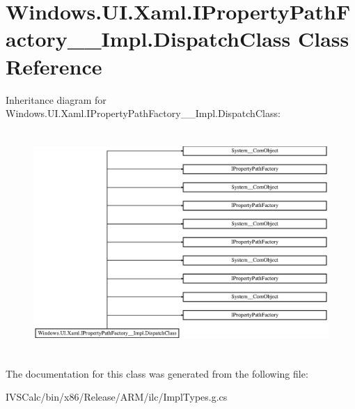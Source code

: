 \hypertarget{class_windows_1_1_u_i_1_1_xaml_1_1_i_property_path_factory_____impl_1_1_dispatch_class}{}\section{Windows.\+U\+I.\+Xaml.\+I\+Property\+Path\+Factory\+\_\+\+\_\+\+Impl.\+Dispatch\+Class Class Reference}
\label{class_windows_1_1_u_i_1_1_xaml_1_1_i_property_path_factory_____impl_1_1_dispatch_class}
Inheritance diagram for Windows.\+U\+I.\+Xaml.\+I\+Property\+Path\+Factory\+\_\+\+\_\+\+Impl.\+Dispatch\+Class\+:\begin{figure}[H]
\begin{center}
\leavevmode
\includegraphics[height=8.508287cm]{class_windows_1_1_u_i_1_1_xaml_1_1_i_property_path_factory_____impl_1_1_dispatch_class}
\end{center}
\end{figure}


The documentation for this class was generated from the following file\+:\begin{DoxyCompactItemize}
\item 
I\+V\+S\+Calc/bin/x86/\+Release/\+A\+R\+M/ilc/Impl\+Types.\+g.\+cs\end{DoxyCompactItemize}
